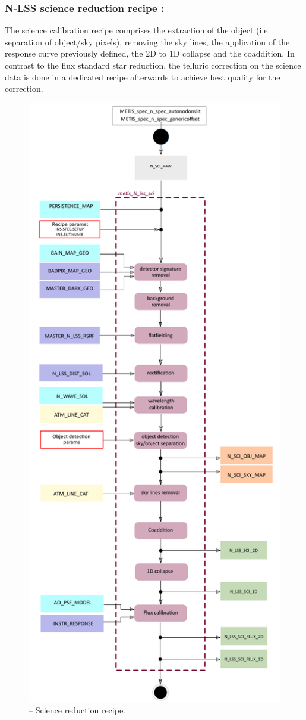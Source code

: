 \subsubsection{N-LSS science reduction recipe :}
The science calibration recipe comprises the extraction of the object (i.e. separation of object/sky pixels), removing the sky lines, the application of the response curve previously defined, the 2D to 1D collapse and the coaddition. In contrast to the flux standard star reduction, the telluric correction on the science data is done in a dedicated recipe afterwards to achieve best quality for the correction.
\begin{figure}[ht]
  \centering
  \includegraphics[width=0.4\textheight]{figures/metis_N_lss_sci_v0.71.pdf}
  \caption[Recipe: ]{ --
    Science reduction recipe.}
  \label{Fig:rec_N_lss_sci}
\end{figure}
